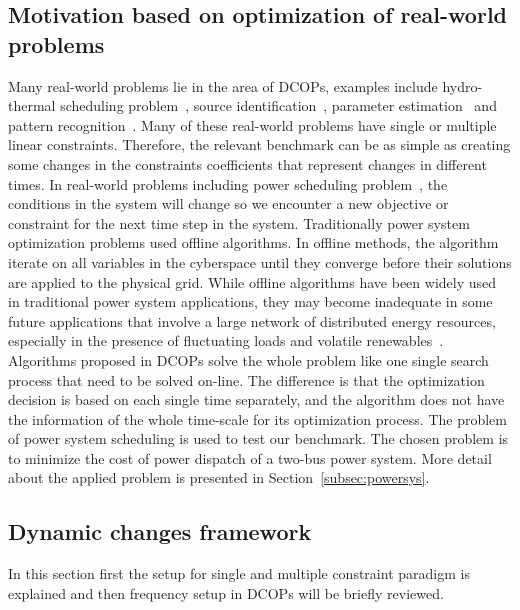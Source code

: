\documentclass[review]{elsarticle}
\begin{document}
\subsection{Motivation based on optimization of real-world problems}
Many real-world problems lie in the area of DCOPs, examples include hydro-thermal scheduling problem~\citep{deb2007dynamic}, source identification~\citep{liu2008adaptive}, parameter estimation~\citep{prata2006simultaneous} and pattern recognition~\citep{pantrigo2008multi}.  Many of these real-world problems have single or multiple linear constraints. Therefore, the relevant benchmark can be as simple as creating some changes in the constraints coefficients that represent changes in different times. 
In real-world problems including power scheduling problem~\citep{morales2014managing}, the conditions in the system will change so we encounter a new objective or constraint for the next time step in the system. 
Traditionally power system optimization problems used offline algorithms. In offline methods, the algorithm iterate on all variables in the cyberspace until they converge before their solutions are applied to the physical grid. While offline algorithms have been widely used in traditional power system applications, they may become inadequate in some future applications that involve a large network of distributed energy resources, especially in the presence of fluctuating loads and volatile renewables~\citep{molzahn2017survey}.
Algorithms proposed in DCOPs solve the whole problem like one single search process that need to be solved on-line. The difference is that the optimization decision is based on each single time separately, and the algorithm does not have the information of the whole time-scale for its optimization process. The problem of power system scheduling is used to test our benchmark. The chosen problem is to minimize the cost of power dispatch of a two-bus power system. More detail about the applied problem is presented in Section~\ref{subsec:powersys}.
 
\subsection{Dynamic changes framework}
In this section first the setup for single and multiple constraint paradigm is explained and then frequency setup in DCOPs will be briefly reviewed.
\end{document}
